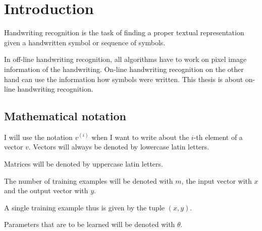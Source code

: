 \chapter{Introduction}\label{ch:Introduction}

Handwriting recognition is the task of finding a proper textual representation
given a handwritten symbol or sequence of symbols.

In off-line handwriting recognition, all algorithms have to work on pixel image
information of the handwriting. On-line handwriting recognition on the other
hand can use the information how symbols were written. This thesis is about
on-line handwriting recognition.


\section{Mathematical notation}

I will use the notation $v^{(i)}$ when I want to write about the $i$-th element
of a vector $v$. Vectors will always be denoted by lowercase latin letters.

Matrices will be denoted by uppercase latin letters.

The number of training examples will be denoted with $m$, the input vector with
$x$ and the output vector with $y$.

A single training example thus is given by the tuple $(x, y)$.

Parameters that are to be learned will be denoted with $\theta$.